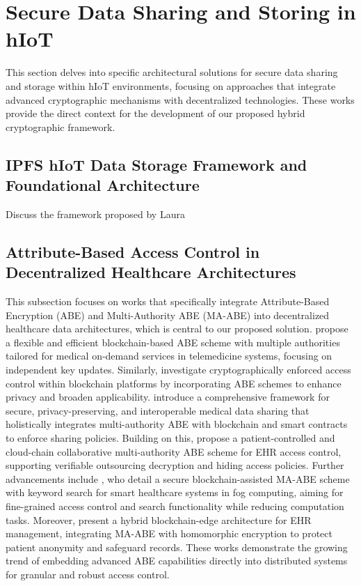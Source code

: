 \documentclass[cic,tc,english]{iiufrgs}
\begin{document}
    \section{Secure Data Sharing and Storing in hIoT}
        \label{sec:securedata}
        This section delves into specific architectural solutions for secure data sharing and storage within hIoT environments, focusing on approaches that integrate advanced cryptographic mechanisms with decentralized technologies. These works provide the direct context for the development of our proposed hybrid cryptographic framework.

        \subsection{IPFS hIoT Data Storage Framework and Foundational Architecture}
            \begin{draft}{Discuss the framework proposed by Laura}
            \end{draft}


        \subsection{Attribute-Based Access Control in Decentralized Healthcare Architectures}
            This subsection focuses on works that specifically integrate Attribute-Based Encryption (ABE) and Multi-Authority ABE (MA-ABE) into decentralized healthcare data architectures, which is central to our proposed solution. \citet{Guo2019Flexible} propose a flexible and efficient blockchain-based ABE scheme with multiple authorities tailored for medical on-demand services in telemedicine systems, focusing on independent key updates. Similarly, \citet{Ghaffaripour2019Cryptographically} investigate cryptographically enforced access control within blockchain platforms by incorporating ABE schemes to enhance privacy and broaden applicability. \citet{Jin2019Secure} introduce a comprehensive framework for secure, privacy-preserving, and interoperable medical data sharing that holistically integrates multi-authority ABE with blockchain and smart contracts to enforce sharing policies. Building on this, \citet{Yang2022Blockchain} propose a patient-controlled and cloud-chain collaborative multi-authority ABE scheme for EHR access control, supporting verifiable outsourcing decryption and hiding access policies. Further advancements include \citet{Li2023Secure}, who detail a secure blockchain-assisted MA-ABE scheme with keyword search for smart healthcare systems in fog computing, aiming for fine-grained access control and search functionality while reducing computation tasks. Moreover, \citet{Guo2023Hybrid} present a hybrid blockchain-edge architecture for EHR management, integrating MA-ABE with homomorphic encryption to protect patient anonymity and safeguard records. These works demonstrate the growing trend of embedding advanced ABE capabilities directly into distributed systems for granular and robust access control.
\end{document}
